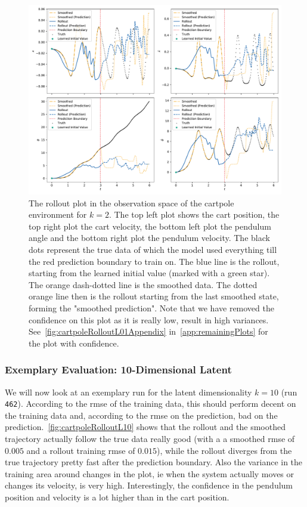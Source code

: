 			\begin{figure}
				\centering
				\includegraphics[width=\linewidth]{figures/results/cartpole-gym/run-latent-dim-02/without-confidence/rollout-observations-N0.pdf}
				\caption{The rollout plot in the observation space of the cartpole environment for \(k = 2\). The top left plot shows the cart position, the top right plot the cart velocity, the bottom left plot the pendulum angle and the bottom right plot the pendulum velocity. The black dots represent the true data of which the model used everything till the red prediction boundary to train on. The blue line is the rollout, starting from the learned initial value (marked with a green star). The orange dash-dotted line is the smoothed data. The dotted orange line then is the rollout starting from the last smoothed state, forming the "smoothed prediction". Note that we have removed the confidence on this plot as it is really low, result in high variances. See~\autoref{fig:cartpoleRolloutL01Appendix} in~\autoref{app:remainingPlots} for the plot with confidence.}
				\label{fig:cartpoleRolloutL02}
			\end{figure}

		\subsubsection{Exemplary Evaluation: 10-Dimensional Latent}
			We will now look at an exemplary run for the latent dimensionality \( k = 10 \) (run \texttt{462}). According to the \ac{rmse} of the training data, this should perform decent on the training data and, according to the \ac{rmse} on the prediction, bad on the prediction.~\autoref{fig:cartpoleRolloutL10} shows that the rollout and the smoothed trajectory actually follow the true data really good (with a a smoothed \ac{rmse} of \(0.005\) and a rollout training \ac{rmse} of \(0.015\)), while the rollout diverges from the true trajectory pretty fast after the prediction boundary. Also the variance in the training area around changes in the plot, \ac{ie} when the system actually moves or changes its velocity, is very high. Interestingly, the confidence in the pendulum position and velocity is a lot higher than in the cart position.

